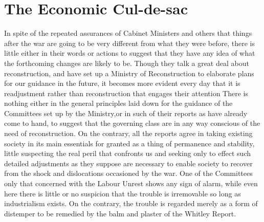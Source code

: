 \documentclass{book}
\begin{document}
\chapter{The Economic Cul-de-sac}
\label{chapter-1}
In spite of the repeated assurances of Cabinet Ministers and others that things after the war are going to be very different from what they were before, there is little either in their words or actions to suggest that they have any idea of what the forthcoming changes are likely to be. Though they talk a great deal about reconstruction, and have set up a Ministry of Reconstruction to elaborate plans for our guidance in the future, it becomes more evident every day that it is readjustment rather than reconstruction that engages their attention There is nothing either in the general principles laid down for the guidance of the Committees set up by the Ministry,\footnotemark[1] or in such of their reports as have already come to hand, to suggest that the governing class are in any way conscious of the need of reconstruction. On the contrary, all the reports agree in taking existing society in its main essentials for granted as a thing of permanence and stability, little suspecting the real peril that confronts us and seeking only to effect such detailed adjustments as they suppose are necessary to enable society to recover from the shock and dislocations occasioned by the war. One of the Committees only that concerned with the Labour Unrest shows any sign of alarm, while even here there is little or no suspicion that the trouble is irremovable so long as industrialism exists. On the contrary, the trouble is regarded merely as a form of distemper to be remedied by the balm and plaster of the Whitley Report.
\end{document}
